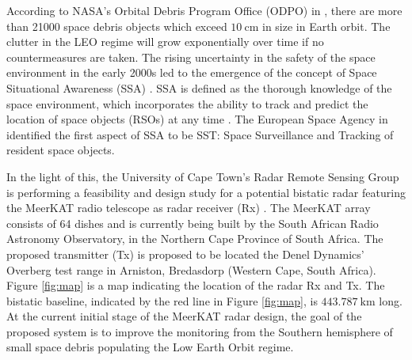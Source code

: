 \documentclass[conference]{IEEEtran}
\begin{document}
According to NASA's Orbital Debris Program Office (ODPO) in \cite{odpo}, there are more than 21000 space debris objects which exceed $10~\mathrm{cm}$ in size in Earth orbit. The clutter in the LEO regime will grow exponentially over time if no countermeasures are taken. The rising uncertainty in the safety of the space environment in the early 2000s led to the emergence of the concept of Space Situational Awareness (SSA) \cite{mehrholz2002detecting}. SSA is defined as the thorough knowledge of the space environment, which incorporates the ability to track and predict the location of space objects (RSOs) at any time \cite{spsiaw}. The European Space Agency in \cite{esaklinkrad,krag2010european} identified the first aspect of SSA to be SST: Space Surveillance and Tracking of resident space objects. 

In the light of this, the University of Cape Town's Radar Remote Sensing Group is performing a feasibility and design study for a potential bistatic radar featuring the MeerKAT radio telescope as radar receiver (Rx) \cite{doreenphd}. The MeerKAT array consists of 64 dishes and is currently being built by the South African Radio Astronomy Observatory, in the Northern Cape Province of South Africa. The proposed transmitter (Tx) is proposed to be located the Denel Dynamics' Overberg test range in Arniston, Bredasdorp (Western Cape, South Africa). Figure \ref{fig:map} is a map indicating the location of the radar Rx and Tx. The bistatic baseline, indicated by the red line in Figure \ref{fig:map}, is $443.787~\mathrm{km}$ long. At the current initial stage of the MeerKAT radar design, the goal of the proposed system is to improve the monitoring from the Southern hemisphere of small space debris populating the Low Earth Orbit regime.
\end{document}
